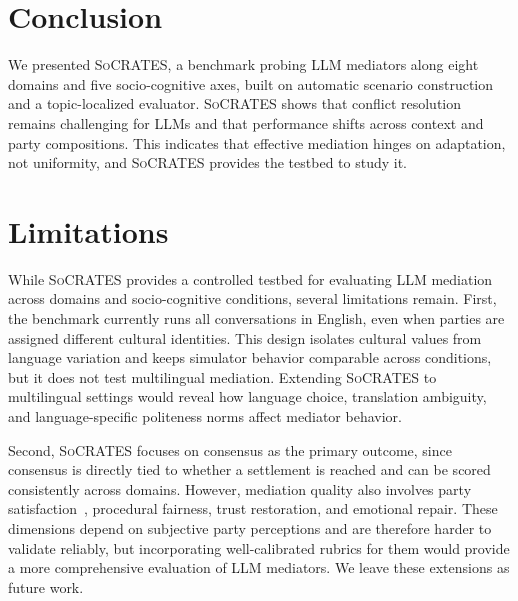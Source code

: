 \documentclass{llmxive}
\providecommand{\algname}{\textsc{SoCRATES}}
\begin{document}


\section{Conclusion}
\label{sec:conclusion}

We presented \algname{}, a benchmark probing LLM mediators along eight domains and five socio-cognitive axes, built on automatic scenario construction and a topic-localized evaluator. \algname{} shows that conflict resolution remains challenging for LLMs and that performance shifts across context and party compositions. This indicates that effective mediation hinges on adaptation, not uniformity, and \algname{} provides the testbed to study it.




\section*{Limitations}

While \algname{} provides a controlled testbed for evaluating LLM mediation across domains and socio-cognitive conditions, several limitations remain. First, the benchmark currently runs all conversations in English, even when parties are assigned different cultural identities. This design isolates cultural values from language variation and keeps simulator behavior comparable across conditions, but it does not test multilingual mediation. Extending \algname{} to multilingual settings would reveal how language choice, translation ambiguity, and language-specific politeness norms affect mediator behavior.

Second, \algname{} focuses on consensus as the primary outcome, since consensus is directly tied to whether a settlement is reached and can be scored consistently across domains. However, mediation quality also involves party satisfaction~\citep{hale2025kodis}, procedural fairness, trust restoration, and emotional repair. These dimensions depend on subjective party perceptions and are therefore harder to validate reliably, but incorporating well-calibrated rubrics for them would provide a more comprehensive evaluation of LLM mediators. We leave these extensions as future work.
\end{document}
